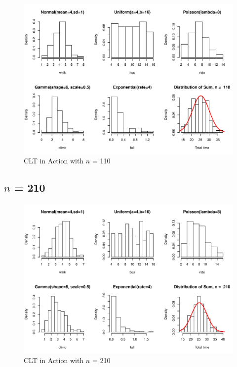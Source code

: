 \documentclass[11pt,letter]{article}\usepackage[]{graphicx}\usepackage[]{color}
\makeatletter
\def\maxwidth{ %
  \ifdim\Gin@nat@width>\linewidth
    \linewidth
  \else
    \Gin@nat@width
  \fi
}
\newenvironment{knitrout}{}{} %
\makeatother
\begin{document}
\begin{knitrout}
\color{fgcolor}\begin{figure}[h]

{\centering \includegraphics[width=\maxwidth]{figure/n-110-1} 

}

\caption[CLT in Action with ]{CLT in Action with $n$ = 110}\label{fig:n-110}
\end{figure}


\end{knitrout}
\newpage
\subsection{$n$ = 210}

\begin{knitrout}
\color{fgcolor}\begin{figure}[h]

{\centering \includegraphics[width=\maxwidth]{figure/n-210-1} 

}

\caption[CLT in Action with ]{CLT in Action with $n$ = 210}\label{fig:n-210}
\end{figure}


\end{knitrout}
\newpage
\end{document}
